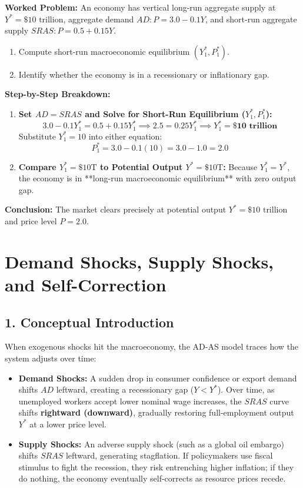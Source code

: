 \documentclass[11pt,letterpaper]{article}
\begin{document}
\noindent\textbf{Worked Problem:}
An economy has vertical long-run aggregate supply at $Y^* = \$10\text{ trillion}$, aggregate demand $AD: P = 3.0 - 0.1Y$, and short-run aggregate supply $SRAS: P = 0.5 + 0.15Y$.
\begin{enumerate}
    \item Compute short-run macroeconomic equilibrium $(Y_1^*, P_1^*)$.
    \item Identify whether the economy is in a recessionary or inflationary gap.
\end{enumerate}

\noindent\textbf{Step-by-Step Breakdown:}
\begin{enumerate}
    \item \textbf{Set $AD = SRAS$ and Solve for Short-Run Equilibrium ($Y_1^*, P_1^*$):}
    \[
    3.0 - 0.1Y_1^* = 0.5 + 0.15Y_1^* \implies 2.5 = 0.25Y_1^* \implies Y_1^* = \mathbf{\$10\text{ trillion}}
    \]
    Substitute $Y_1^* = 10$ into either equation:
    \[
    P_1^* = 3.0 - 0.1(10) = 3.0 - 1.0 = \mathbf{2.0}
    \]

    \item \textbf{Compare $Y_1^* = \$10\text{T}$ to Potential Output $Y^* = \$10\text{T}$:}
    Because $Y_1^* = Y^*$, the economy is in **long-run macroeconomic equilibrium** with zero output gap.
\end{enumerate}
\textbf{Conclusion:} The market clears precisely at potential output $Y^* = \$10\text{ trillion}$ and price level $P = 2.0$.

\section{Demand Shocks, Supply Shocks, and Self-Correction}

\subsection*{1. Conceptual Introduction}
When exogenous shocks hit the macroeconomy, the AD-AS model traces how the system adjusts over time:
\begin{itemize}
    \item \textbf{Demand Shocks:} A sudden drop in consumer confidence or export demand shifts $AD$ leftward, creating a recessionary gap ($Y < Y^*$). Over time, as unemployed workers accept lower nominal wage increases, the $SRAS$ curve shifts \textbf{rightward (downward)}, gradually restoring full-employment output $Y^*$ at a lower price level.
    \item \textbf{Supply Shocks:} An adverse supply shock (such as a global oil embargo) shifts $SRAS$ leftward, generating stagflation. If policymakers use fiscal stimulus to fight the recession, they risk entrenching higher inflation; if they do nothing, the economy eventually self-corrects as resource prices recede.
\end{itemize}
\end{document}
